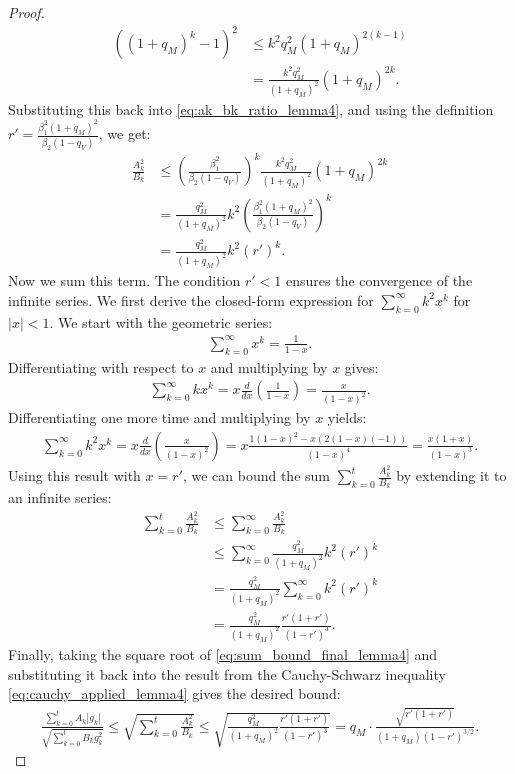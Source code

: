 \documentclass[11pt, letterpaper]{article}
\begin{document}
\begin{proof}
\begin{align}
((1+q_M)^k-1)^2 &\le k^2 q_M^2 (1+q_M)^{2(k-1)} \nonumber \\
&= \frac{k^2 q_M^2}{(1+q_M)^2} (1+q_M)^{2k}. \label{eq:squared_inequality_lemma4}
\end{align}
Substituting this back into \eqref{eq:ak_bk_ratio_lemma4}, and using the definition $r' = \frac{\beta_1^2(1+q_M)^2}{\beta_2(1-q_V)}$, we get:
\begin{align}
\frac{A_k^2}{B_k} &\le \left(\frac{\beta_1^2}{\beta_2(1-q_V)}\right)^k \frac{k^2 q_M^2}{(1+q_M)^2} (1+q_M)^{2k} \nonumber \\
&= \frac{q_M^2}{(1+q_M)^2} k^2 \left(\frac{\beta_1^2(1+q_M)^2}{\beta_2(1-q_V)}\right)^k \nonumber \\
&= \frac{q_M^2}{(1+q_M)^2} k^2 (r')^k. \label{eq:ak_bk_bound_final_lemma4}
\end{align}
Now we sum this term. The condition $r' < 1$ ensures the convergence of the infinite series. We first derive the closed-form expression for $\sum_{k=0}^{\infty} k^2 x^k$ for $|x|<1$. We start with the geometric series:
\begin{align}
\sum_{k=0}^{\infty} x^k = \frac{1}{1-x}. \label{eq:geom_series_lemma4}
\end{align}
Differentiating with respect to $x$ and multiplying by $x$ gives:
\begin{align}
\sum_{k=0}^{\infty} k x^k = x \frac{d}{dx}\left(\frac{1}{1-x}\right) = \frac{x}{(1-x)^2}. \label{eq:k_geom_series_lemma4}
\end{align}
Differentiating one more time and multiplying by $x$ yields:
\begin{align}
\sum_{k=0}^{\infty} k^2 x^k = x \frac{d}{dx}\left(\frac{x}{(1-x)^2}\right) = x \frac{1(1-x)^2 - x(2(1-x)(-1))}{(1-x)^4} = \frac{x(1+x)}{(1-x)^3}. \label{eq:k2_geom_series_lemma4}
\end{align}
Using this result with $x=r'$, we can bound the sum $\sum_{k=0}^{t} \frac{A_k^2}{B_k}$ by extending it to an infinite series:
\begin{align}
\sum_{k=0}^{t} \frac{A_k^2}{B_k} &\le \sum_{k=0}^{\infty} \frac{A_k^2}{B_k} \nonumber \\
&\le \sum_{k=0}^{\infty} \frac{q_M^2}{(1+q_M)^2} k^2 (r')^k \nonumber \\
&= \frac{q_M^2}{(1+q_M)^2} \sum_{k=0}^{\infty} k^2 (r')^k \nonumber \\
&= \frac{q_M^2}{(1+q_M)^2} \frac{r'(1+r')}{(1-r')^3}. \label{eq:sum_bound_final_lemma4}
\end{align}
Finally, taking the square root of \eqref{eq:sum_bound_final_lemma4} and substituting it back into the result from the Cauchy-Schwarz inequality \eqref{eq:cauchy_applied_lemma4} gives the desired bound:
\begin{align}
\frac{\sum_{k=0}^{t} A_k |g_k|}{\sqrt{\sum_{k=0}^{t} B_k g_k^2}} \le \sqrt{\sum_{k=0}^{t} \frac{A_k^2}{B_k}} \le \sqrt{\frac{q_M^2}{(1+q_M)^2} \frac{r'(1+r')}{(1-r')^3}} = q_M \cdot \frac{\sqrt{r'(1+r')}}{(1+q_M)(1-r')^{3/2}}. \label{eq:final_result_lemma4}
\end{align}
\end{proof}
\end{document}
